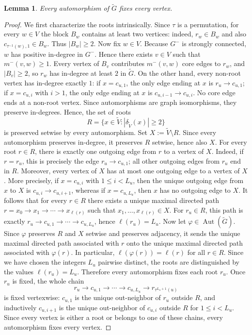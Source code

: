 \documentclass[a4paper,10pt]{amsart}
\theoremstyle{plain}
\newtheorem{lemma}[theorem]{Lemma}
\theoremstyle{definition}
\DeclareMathOperator{\Aut}{Aut}
\begin{document}
\begin{lemma}
\label{lem:vertex-rigidity-refinement-permutation}
Every automorphism of $\widetilde G$ fixes every vertex.
\end{lemma}
\begin{proof}
We first characterize the roots intrinsically. Since $\tau$ is a permutation, for every $w\in V$ the block $B_w$ contains at least two vertices: indeed, $r_w\in B_w$ and also $c_{\tau^{-1}(w),1}\in B_w$. Thus $|B_w|\ge 2$. Now fix $w\in V$. Because $G^-$ is strongly connected, $w$ has positive in-degree in $G^-$. Hence there exists $v\in V$ such that $m^-(v,w)\ge 1$. Every vertex of $B_v$ contributes $m^-(v,w)$ core edges to $r_w$, and $|B_v|\ge 2$, so $r_w$ has in-degree at least $2$ in $\widetilde G$. On the other hand, every non-root vertex has in-degree exactly $1$: if $x=c_{u,1}$, the only edge ending at $x$ is $r_u\to c_{u,1}$; if $x=c_{u,i}$ with $i>1$, the only edge ending at $x$ is $c_{u,i-1}\to c_{u,i}$. No core edge ends at a non-root vertex. Since automorphisms are graph isomorphisms, they preserve in-degrees. Hence, the set of roots
\[
R=\{x\in \widetilde V: |\delta_{\widetilde V}(x)|\ge 2\}
\]
is preserved setwise by every automorphism. Set $X:=\widetilde V\setminus R$. Since every automorphism preserves in-degree, it preserves $R$ setwise, hence also $X$. For every root $r\in R$, there is exactly one outgoing edge from $r$ to a vertex of $X$. Indeed, if $r=r_u$, this is precisely the edge $r_u\to c_{u,1}$; all other outgoing edges from $r_u$ end in $R$. Moreover, every vertex of $X$ has at most one outgoing edge to a vertex of $X$. More precisely, if $x=c_{u,i}$ with $1\le i<L_u$, then the unique outgoing edge from $x$ to $X$ is $c_{u,i}\to c_{u,i+1}$, whereas if $x=c_{u,L_u}$, then $x$ has no outgoing edge to $X$. It follows that for every $r\in R$ there exists a unique maximal directed path $r=x_0\to x_1\to \cdots \to x_{\ell(r)}$ such that $x_1,\dots,x_{\ell(r)}\in X$.
For $r_u\in R$, this path is exactly $r_u\to c_{u,1}\to \cdots \to c_{u,L_u}$, hence $\ell(r_u)=L_u$. Now let $\varphi\in\Aut(\widetilde G)$. Since $\varphi$ preserves $R$ and $X$ setwise and preserves adjacency, it sends the unique maximal directed path associated with $r$ onto the unique maximal directed path associated with $\varphi(r)$. In particular, $\ell(\varphi(r))=\ell(r)$ for all $r\in R$.
Since we have chosen the integers $L_u$ pairwise distinct, the roots are distinguished by the values $\ell(r_u)=L_u$. Therefore every automorphism fixes each root $r_u$. Once $r_u$ is fixed, the whole chain
\[
r_u\to c_{u,1}\to \cdots \to c_{u,L_u}\to r_{\tau^{L_u+1}(u)}
\]
is fixed vertexwise: $c_{u,1}$ is the unique out-neighbor of $r_u$ outside $R$, and inductively $c_{u,i+1}$ is the unique out-neighbor of $c_{u,i}$ outside $R$ for $1\le i<L_u$. Since every vertex is either a root or belongs to one of these chains, every automorphism fixes every vertex.
\end{proof}
\end{document}
